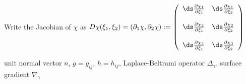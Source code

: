 \documentclass[10pt]{article}
\begin{document}
Write the Jacobian of $\chi$ as $D\chi(\xi_1,\xi_2) = \left( \partial_1 \chi,
\partial_2 \chi \right) := \left(
\begin{array}{cc}
  \ds  \frac{\partial \chi_1}{\partial \xi_1} & \ds \frac{\partial \chi_1}{\partial \xi_2} \\ 
                                          &                                        \\
  \ds  \frac{\partial \chi_2}{\partial \xi_1} & \ds \frac{\partial \chi_2}{\partial \xi_2} \\ 
                                          &                                        \\
  \ds  \frac{\partial \chi_3}{\partial \xi_1} & \ds \frac{\partial \chi_3}{\partial \xi_2} 
\end{array} \right)$ 

\begin{definition} 
   
\end{definition}



\begin{definition} 
   
\end{definition}


unit normal vector $n$, $g = g_{ij}$, $h = h_{ij}$, Laplace-Beltrami operator $\Delta_{\gamma}$,
surface gradient $\nabla_{\gamma}$
\end{document}
